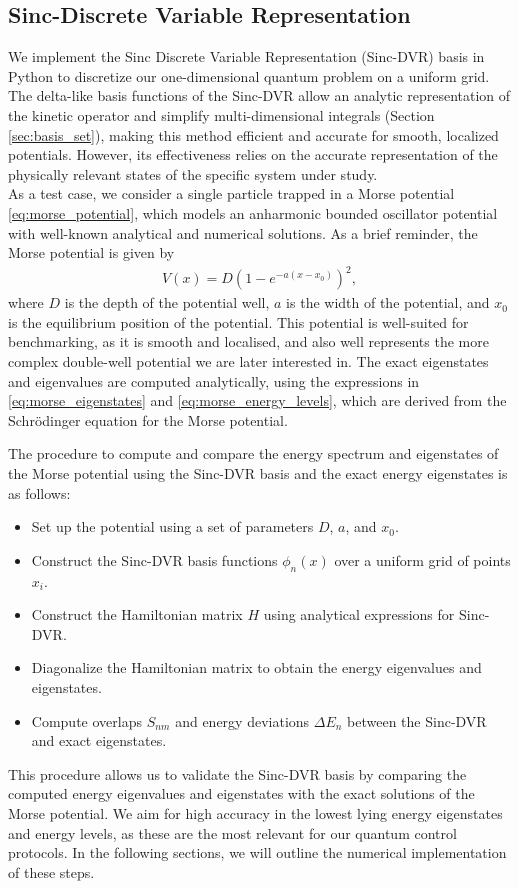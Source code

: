 \documentclass{subfiles}
\begin{document}
\subsection{Sinc-Discrete Variable Representation}\label{sec:sinc_dvr_validation}
We implement the Sinc Discrete Variable Representation (Sinc-DVR) basis in Python to discretize our one-dimensional quantum problem on a uniform grid. The delta-like basis functions of the Sinc-DVR allow an analytic representation of the kinetic operator and simplify multi-dimensional integrals (Section \ref{sec:basis_set}), making this method efficient and accurate for smooth, localized potentials. However, its effectiveness relies on the accurate representation of the physically relevant states of the specific system under study. \\

As a test case, we consider a single particle trapped in a Morse potential \eqref{eq:morse_potential}, which models an anharmonic bounded oscillator potential with well-known analytical and numerical solutions. As a brief reminder, the Morse potential is given by
\begin{align*}
    V(x) = D \left(1 - e^{-a(x - x_0)}\right)^2,
\end{align*}
where $D$ is the depth of the potential well, $a$ is the width of the potential, and $x_0$ is the equilibrium position of the potential. This potential is well-suited for benchmarking, as it is smooth and localised, and also well represents the more complex double-well potential we are later interested in. The exact eigenstates and eigenvalues are computed analytically, using the expressions in \eqref{eq:morse_eigenstates} and \eqref{eq:morse_energy_levels}, which are derived from the Schrödinger equation for the Morse potential.

The procedure to compute and compare the energy spectrum and eigenstates of the Morse potential using the Sinc-DVR basis and the exact energy eigenstates is as follows:
\begin{itemize}
    \item Set up the potential using a set of parameters $D$, $a$, and $x_0$.
    \item Construct the Sinc-DVR basis functions $\phi_n(x)$ over a uniform grid of points $x_i$.
    \item Construct the Hamiltonian matrix $H$ using analytical expressions for Sinc-DVR.
    \item Diagonalize the Hamiltonian matrix to obtain the energy eigenvalues and eigenstates.
    \item Compute overlaps $S_{nm}$ and energy deviations $\Delta E_n$ between the Sinc-DVR and exact eigenstates.
\end{itemize}
This procedure allows us to validate the Sinc-DVR basis by comparing the computed energy eigenvalues and eigenstates with the exact solutions of the Morse potential. We aim for high accuracy in the lowest lying energy eigenstates and energy levels, as these are the most relevant for our quantum control protocols. In the following sections, we will outline the numerical implementation of these steps.
\end{document}
